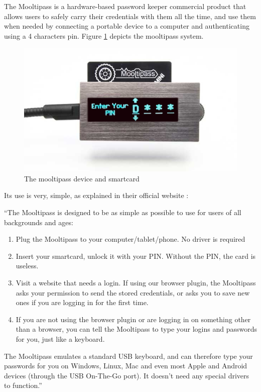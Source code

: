 The Mooltipass is a hardware-based password keeper commercial product that allows users to safely carry their credentials with them all the time, and use them when needed by connecting a portable device to a computer and authenticating using a 4 characters pin. 
Figure \ref{fig:mool} depicts the mooltipass system.

\begin{figure}[htb]
  \centering
  \captionsetup{justification=centering}
  \centerline{\includegraphics[width=0.6\columnwidth]{chapters/figures/related/mooltipass.jpg}}
  \caption{The mooltipass device and smartcard}
  \label{fig:mool}
\end{figure}

Its use is very, simple, as explained in their official website \cite{mooltipass}:

``The Mooltipass is designed to be as simple as possible to use for users of all backgrounds and ages:
\begin{enumerate}
\setlength\itemsep{-3pt}

\item Plug the Mooltipass to your computer/tablet/phone. No driver is required
\item Insert your smartcard, unlock it with your PIN. Without the PIN, the card is useless.
\item Visit a website that needs a login. If using our browser plugin, the Mooltipass asks your permission to send the stored credentials, or asks you to save new ones if you are logging in for the first time.
\item If you are not using the browser plugin or are logging in on something other than a browser, you can tell the Mooltipass to type your logins and passwords for you, just like a keyboard.
\end{enumerate}

The Mooltipass emulates a standard USB keyboard, and can therefore type your passwords for you on Windows, Linux, Mac and even most Apple and Android devices (through the USB On-The-Go port). It doesn't need any special drivers to function.''

